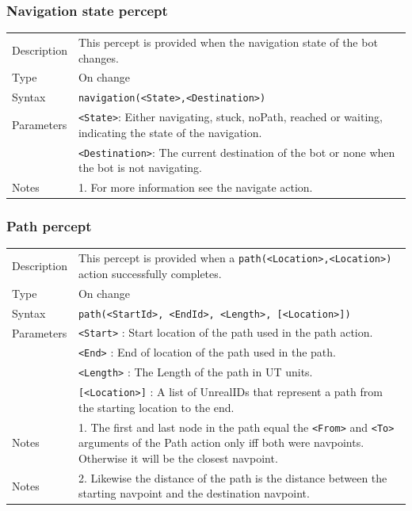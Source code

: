 \documentclass[11pt,a4paper]{article}
\begin{document}
\subsubsection*{Navigation state percept}
\begin{small}
\begin{tabular}{p{2cm}p{9cm}}
Description & This percept is provided when the navigation state of the bot changes. \\
Type & On change\\
Syntax & \verb|navigation(<State>,<Destination>)|\\
Parameters &
\verb|<State>|: Either navigating, stuck, noPath, reached or waiting, indicating the state of the navigation. \\
& \verb|<Destination>|: The current destination of the bot or none when the bot is not navigating.\\
Notes &
	1.	For more information see the navigate action. \\
\end{tabular}
\end{small}


\subsubsection*{Path percept}
\begin{small}
\begin{tabular}{p{2cm}p{9cm}}
Description & This percept is provided when a \verb|path(<Location>,<Location>)| action successfully completes. \\
Type & On change\\
Syntax & \verb|path(<StartId>, <EndId>, <Length>, [<Location>])|\\
Parameters 
	& \verb|<Start>| : Start location of the path used in the path action. \\
	& \verb|<End>| : End of location of the path used in the path. \\
	&  \verb|<Length>| : The Length of the path in UT units. \\
	& \verb|[<Location>]| : A list of UnrealIDs that represent a path from the starting location to the end. \\
Notes & 1.	The first and last node in the path equal the \verb|<From>| and \verb|<To>| arguments of the Path action only iff both were navpoints. Otherwise it will be the closest navpoint. \\
Notes & 2.	Likewise the distance of the path is the distance between the starting navpoint and the destination navpoint.
\end{tabular}
\end{small}
\end{document}
